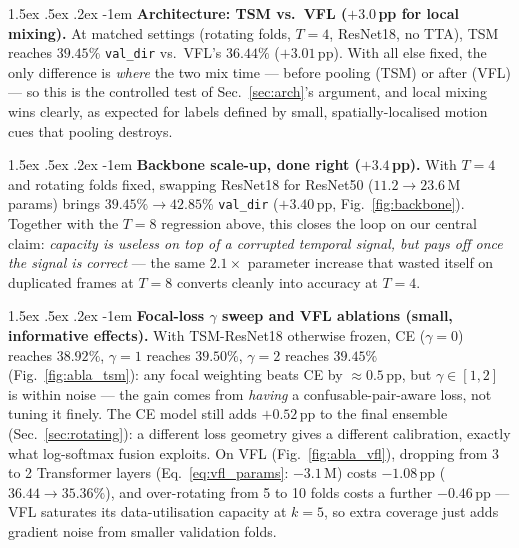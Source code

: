 \documentclass[10pt,twocolumn,letterpaper]{article}
\makeatletter
\renewcommand\paragraph{\@startsection{paragraph}{4}{\z@}%
  {1.5ex \@plus .5ex \@minus .2ex}%
  {-1em}%
  {\normalfont\normalsize\bfseries}}
\makeatother
\begin{document}
\paragraph{\textbf{Architecture: TSM vs.\ VFL ($+3.0$\,pp for local mixing).}}
At matched settings (rotating folds, $T{=}4$, ResNet18, no TTA), TSM reaches
$39.45\%$ \texttt{val\_dir} vs.\ VFL's $36.44\%$ ($+3.01$\,pp). With all else
fixed, the only difference is \emph{where} the two mix time --- before pooling
(TSM) or after (VFL) --- so this is the controlled test of
Sec.~\ref{sec:arch}'s argument, and local mixing wins clearly, as expected for
labels defined by small, spatially-localised motion cues that pooling destroys.

\paragraph{\textbf{Backbone scale-up, done right ($+3.4$\,pp).}}
With $T{=}4$ and rotating folds fixed, swapping ResNet18 for ResNet50
($11.2\!\rightarrow\!23.6$\,M params) brings
$39.45\%\!\rightarrow\!42.85\%$ \texttt{val\_dir} ($+3.40$\,pp,
Fig.~\ref{fig:backbone}). Together with the $T{=}8$ regression above, this
closes the loop on our central claim: \emph{capacity is useless on top of a
corrupted temporal signal, but pays off once the signal is correct} --- the
same $2.1\times$ parameter increase that wasted itself on duplicated frames at
$T{=}8$ converts cleanly into accuracy at $T{=}4$.

\paragraph{\textbf{Focal-loss $\gamma$ sweep and VFL ablations (small, informative effects).}}
With TSM-ResNet18 otherwise frozen, CE ($\gamma{=}0$) reaches $38.92\%$,
$\gamma{=}1$ reaches $39.50\%$, $\gamma{=}2$ reaches $39.45\%$
(Fig.~\ref{fig:abla_tsm}): any focal weighting beats CE by
${\approx}0.5$\,pp, but $\gamma{\in}[1,2]$ is within noise --- the gain comes
from \emph{having} a confusable-pair-aware loss, not tuning it finely. The CE
model still adds $+0.52$\,pp to the final ensemble (Sec.~\ref{sec:rotating}): a
different loss geometry gives a different calibration, exactly what log-softmax
fusion exploits. On VFL (Fig.~\ref{fig:abla_vfl}), dropping from 3 to 2
Transformer layers (Eq.~\eqref{eq:vfl_params}: $-3.1$\,M) costs $-1.08$\,pp
($36.44\!\rightarrow\!35.36\%$), and over-rotating from 5 to 10 folds costs a
further $-0.46$\,pp --- VFL saturates its data-utilisation capacity at $k{=}5$,
so extra coverage just adds gradient noise from smaller validation folds.
\end{document}
